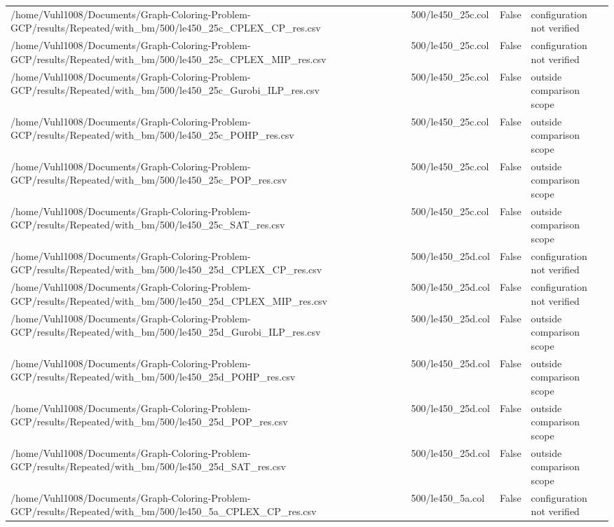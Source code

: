 \begin{table}[htbp]
\begin{tabular}{llll}
/home/Vuhl1008/Documents/Graph-Coloring-Problem-GCP/results/Repeated/with\_bm/500/le450\_25c\_CPLEX\_CP\_res.csv & 500/le450\_25c.col & False & configuration not verified \\
/home/Vuhl1008/Documents/Graph-Coloring-Problem-GCP/results/Repeated/with\_bm/500/le450\_25c\_CPLEX\_MIP\_res.csv & 500/le450\_25c.col & False & configuration not verified \\
/home/Vuhl1008/Documents/Graph-Coloring-Problem-GCP/results/Repeated/with\_bm/500/le450\_25c\_Gurobi\_ILP\_res.csv & 500/le450\_25c.col & False & outside comparison scope \\
/home/Vuhl1008/Documents/Graph-Coloring-Problem-GCP/results/Repeated/with\_bm/500/le450\_25c\_POHP\_res.csv & 500/le450\_25c.col & False & outside comparison scope \\
/home/Vuhl1008/Documents/Graph-Coloring-Problem-GCP/results/Repeated/with\_bm/500/le450\_25c\_POP\_res.csv & 500/le450\_25c.col & False & outside comparison scope \\
/home/Vuhl1008/Documents/Graph-Coloring-Problem-GCP/results/Repeated/with\_bm/500/le450\_25c\_SAT\_res.csv & 500/le450\_25c.col & False & outside comparison scope \\
/home/Vuhl1008/Documents/Graph-Coloring-Problem-GCP/results/Repeated/with\_bm/500/le450\_25d\_CPLEX\_CP\_res.csv & 500/le450\_25d.col & False & configuration not verified \\
/home/Vuhl1008/Documents/Graph-Coloring-Problem-GCP/results/Repeated/with\_bm/500/le450\_25d\_CPLEX\_MIP\_res.csv & 500/le450\_25d.col & False & configuration not verified \\
/home/Vuhl1008/Documents/Graph-Coloring-Problem-GCP/results/Repeated/with\_bm/500/le450\_25d\_Gurobi\_ILP\_res.csv & 500/le450\_25d.col & False & outside comparison scope \\
/home/Vuhl1008/Documents/Graph-Coloring-Problem-GCP/results/Repeated/with\_bm/500/le450\_25d\_POHP\_res.csv & 500/le450\_25d.col & False & outside comparison scope \\
/home/Vuhl1008/Documents/Graph-Coloring-Problem-GCP/results/Repeated/with\_bm/500/le450\_25d\_POP\_res.csv & 500/le450\_25d.col & False & outside comparison scope \\
/home/Vuhl1008/Documents/Graph-Coloring-Problem-GCP/results/Repeated/with\_bm/500/le450\_25d\_SAT\_res.csv & 500/le450\_25d.col & False & outside comparison scope \\
/home/Vuhl1008/Documents/Graph-Coloring-Problem-GCP/results/Repeated/with\_bm/500/le450\_5a\_CPLEX\_CP\_res.csv & 500/le450\_5a.col & False & configuration not verified \\

\end{tabular}
\end{table}
